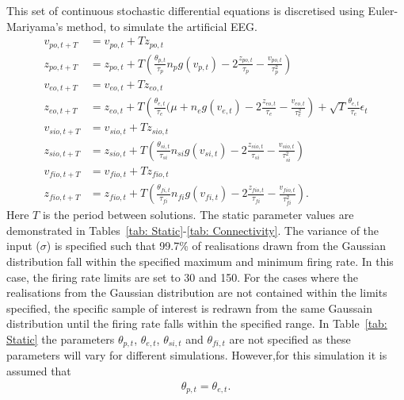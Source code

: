 This set of continuous stochastic differential equations is discretised using Euler-Mariyama's method, to simulate the artificial EEG. \begin{align}
v_{po,t+T}&=v_{po,t}+Tz_{po,t}\\
z_{po,t+T}&=z_{po,t}+T\left(\frac{\theta_{p,t}}{\tau_{p}}n_{p}g(v_{p,t})-2\frac{z_{po,t}}{\tau_{p}}-\frac{v_{po,t}}{\tau_{p}^{2}}\right)\\
v_{eo,t+T}&=v_{eo,t}+Tz_{eo,t}\\
z_{eo,t+T}&=z_{eo,t}+T\left(\frac{\theta_{e,t}}{\tau_{e}}(\mu +n_{e}g(v_{e,t})-2\frac{z_{eo,t}}{\tau_{e}}-\frac{v_{eo,t}}{\tau_{e}^{2}}\right) + \sqrt{T}\frac{\theta_{e,t}}{\tau_{e}}\epsilon_{t}\\
v_{sio,t+T}&=v_{sio,t}+Tz_{sio,t}\\
z_{sio,t+T}&=z_{sio,t}+T\left(\frac{\theta_{si,t}}{\tau_{si}}n_{si}g(v_{si,t})-2\frac{z_{sio,t}}{\tau_{si}}-\frac{v_{sio,t}}{\tau_{si}^{2}}\right)\\
v_{fio,t+T}&=v_{fio,t}+Tz_{fio,t}\\
z_{fio,t+T}&=z_{fio,t}+T\left(\frac{\theta_{fi,t}}{\tau_{fi}}n_{fi}g(v_{fi,t})-2\frac{z_{fio,t}}{\tau_{fi}}-\frac{v_{fio,t}}{\tau_{fi}^{2}}\right).
\end{align} Here $T$ is the period between solutions. The static parameter values are demonstrated in  Tables~\ref{tab: Static}-\ref{tab: Connectivity}. The variance of the input ($\sigma$) is specified such that 99.7\% of realisations drawn from the Gaussian distribution fall within the specified maximum and minimum firing rate. In this case, the firing rate limits are set to 30 and 150. For the cases where the realisations from the Gaussian distribution are not contained within the limits specified, the specific sample of interest is redrawn from the same Gaussain distribution until the firing rate falls within the specified range. In Table~\ref{tab: Static} the parameters $\theta_{p,t}$, $\theta_{e,t}$, $\theta_{si,t}$ and $\theta_{fi,t}$ are not specified as these parameters will vary for different simulations. However,for this simulation it is assumed that \begin{align}
\theta_{p,t} = \theta_{e,t}.
\end{align}


